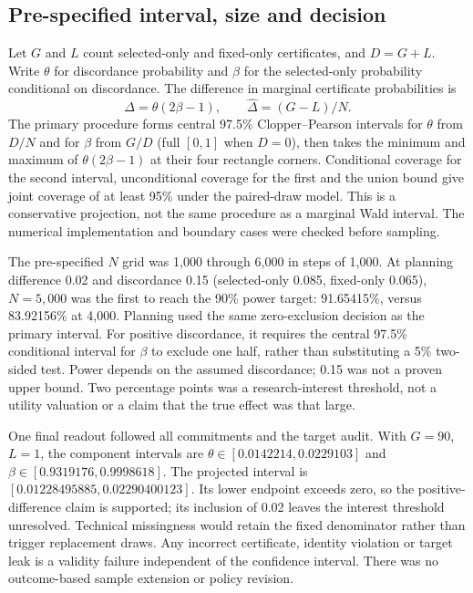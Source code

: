 \subsection{Pre-specified interval, size and decision}

Let $G$ and $L$ count selected-only and fixed-only certificates, and
$D=G+L$. Write $\theta$ for discordance probability and $\beta$ for the
selected-only probability conditional on discordance. The difference
in marginal certificate probabilities is
\[
\Delta=\theta(2\beta-1),\qquad
\widehat\Delta=(G-L)/N.
\]
The primary procedure forms central 97.5\% Clopper--Pearson intervals
for $\theta$ from $D/N$ and for $\beta$ from $G/D$ (full $[0,1]$ when
$D=0$), then takes the minimum and maximum of
$\theta(2\beta-1)$ at their four rectangle corners. Conditional
coverage for the second interval, unconditional coverage for the first
and the union bound give joint coverage of at least 95\% under the
paired-draw model. This is a conservative projection, not the same
procedure as a marginal Wald interval. The numerical implementation
and boundary cases were checked before sampling.

The pre-specified $N$ grid was 1,000 through 6,000 in steps of 1,000.
At planning difference 0.02 and discordance 0.15 (selected-only 0.085,
fixed-only 0.065), $N=5{,}000$ was the first to reach the 90\% power
target: 91.65415\%, versus 83.92156\% at 4,000. Planning used the same
zero-exclusion decision as the primary interval. For positive
discordance, it requires the central 97.5\% conditional interval for
$\beta$ to exclude one half, rather than substituting a 5\% two-sided
test. Power depends on the assumed discordance; 0.15 was not a proven
upper bound. Two percentage points was a research-interest threshold,
not a utility valuation or a claim that the true effect was that large.

One final readout followed all commitments and the target audit.
With $G=90$, $L=1$, the component intervals are
$\theta\in[0.0142214,0.0229103]$ and
$\beta\in[0.9319176,0.9998618]$. The projected interval is
$[0.01228495885,0.02290400123]$. Its lower endpoint exceeds zero,
so the positive-difference claim is supported; its inclusion of 0.02
leaves the interest threshold unresolved. Technical missingness would
retain the fixed denominator rather than trigger replacement draws.
Any incorrect certificate, identity violation or target leak is a
validity failure independent of the confidence interval. There was no
outcome-based sample extension or policy revision.

